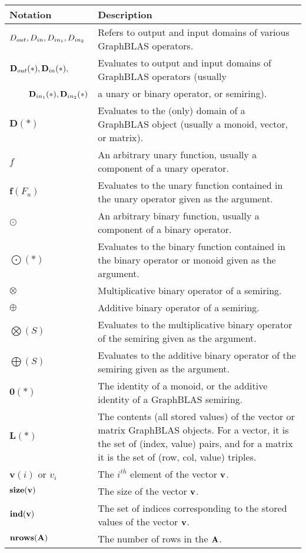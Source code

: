 \begin{tabular}[H]{l|p{5in}}
Notation & Description \\
\hline
$\mbox{$D_{out}$}, \mbox{$D_{in}$}, \mbox{$D_{in_{1}}$}, \mbox{$D_{in_{2}}$}$  & Refers to output and input domains of various GraphBLAS operators. \\
$\mbox{$\mathbf{D}_{out}$}(*), \mbox{$\mathbf{D}_{in}$}(*),$ & Evaluates to output and input domains of GraphBLAS operators (usually \\
~~~~$\mbox{$\mathbf{D}_{in_{1}}$}(*), \mbox{$\mathbf{D}_{in_{2}}$}(*)$ & a unary or binary operator, or semiring). \\
$\mathbf{D}(*)$   & Evaluates to the (only) domain of a GraphBLAS object (usually a monoid, vector, or matrix). \\ 
$f$             & An arbitrary unary function, usually a component of a unary operator. \\
$\mathbf{f}(F_u)$ & Evaluates to the unary function contained in the unary operator given as the argument. \\
$\odot$         & An arbitrary binary function, usually a component of a binary operator. \\
$\mathbf{\bigodot}(*)$ & Evaluates to the binary function contained in the binary operator or monoid given as the argument. \\
$\otimes$       & Multiplicative binary operator of a semiring. \\
$\oplus$        & Additive binary operator of a semiring. \\
$\mathbf{\bigotimes}(S)$ & Evaluates to the multiplicative binary operator of the semiring given as the argument. \\
$\mathbf{\bigoplus}(S)$ & Evaluates to the additive binary operator of the semiring given as the argument. \\
$\mathbf{0}(*)$   & The identity of a monoid, or the additive identity of a GraphBLAS semiring. \\
$\mathbf{L}(*)$   & The contents (all stored values) of the vector or matrix GraphBLAS objects.  For a vector, it is the set of (index, value) pairs, and for a matrix it is the set of (row, col, value) triples. \\
$\mathbf{v}(i)$ or $v_i$   & The $i^{th}$ element of the vector ${\bf v}$.\\
$\mathbf{size}({\bf v})$ & The size of the vector ${\bf v}$.\\
$\mathbf{ind}({\bf v})$ & The set of indices corresponding to the stored values of the vector ${\bf v}$.\\
$\mathbf{nrows}({\bf A})$ & The number of rows in the ${\bf A}$.\\

\end{tabular}

